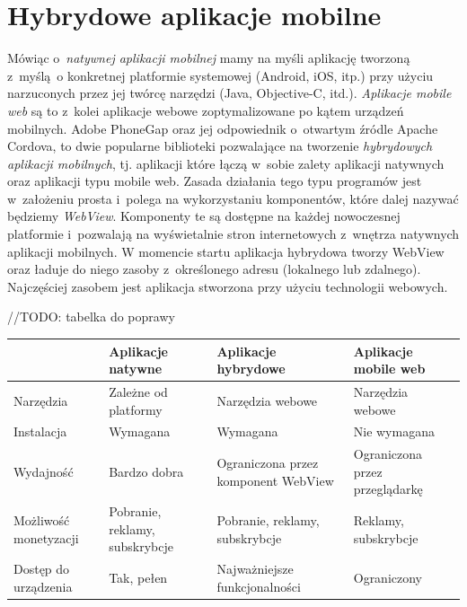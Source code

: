 \documentclass[brudnopis]{xmgr}
\begin{document}
\section{Hybrydowe aplikacje mobilne}
Mówiąc o~\textit{natywnej aplikacji mobilnej} mamy na myśli aplikację tworzoną z~myślą~o konkretnej platformie systemowej (Android, iOS, itp.) przy użyciu narzuconych przez jej twórcę narzędzi (Java, Objective-C, itd.).  \textit{Aplikacje mobile web} są to z~kolei aplikacje webowe zoptymalizowane po kątem urządzeń mobilnych.
Adobe PhoneGap oraz jej odpowiednik o~otwartym źródle Apache Cordova, to
dwie popularne biblioteki pozwalające na tworzenie \textit{hybrydowych aplikacji
mobilnych}, tj. aplikacji które łączą w~sobie zalety aplikacji natywnych oraz aplikacji
typu mobile web. Zasada działania tego typu programów jest w~założeniu prosta i~polega na wykorzystaniu komponentów, które dalej nazywać będziemy \textit{WebView}.
Komponenty te są dostępne na każdej nowoczesnej platformie i~pozwalają na
wyświetalnie stron internetowych z~wnętrza natywnych aplikacji mobilnych. 
W momencie startu aplikacja hybrydowa tworzy WebView oraz ładuje do niego zasoby z~określonego adresu (lokalnego lub zdalnego). Najczęściej zasobem jest aplikacja stworzona przy użyciu technologii webowych.     

//TODO: tabelka do poprawy
\begin{center}
    \begin{tabularx}{\textwidth}{ | X | X | X | X |}
    \hline
   			& Aplikacje natywne        & Aplikacje hybrydowe 	& Aplikacje mobile web 			\\ \hline
    Narzędzia	& Zależne od platformy	&   Narzędzia webowe	& 	Narzędzia webowe			\\ \hline
    Instalacja	&        Wymagana               &	 Wymagana         	& 		Nie wymagana		\\ \hline
    Wydajność	& 	Bardzo dobra		&Ograniczona przez komponent WebView&Ograniczona przez przeglądarkę\\ \hline
    Możliwość monetyzacji
    			&  Pobranie, reklamy, subskrybcje  & Pobranie, reklamy, subskrybcje & Reklamy, subskrybcje \\ \hline
    Dostęp do urządzenia
    			& 	Tak, pełen  	         &Najważniejsze funkcjonalności& Ograniczony        \\ \hline
    \end{tabularx}
\end{center}
\end{document}
